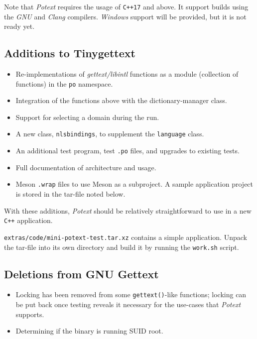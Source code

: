 \documentclass[
 11pt,
 twoside,
 a4paper,
 final                                 %
]{article}
\begin{document}
   Note that \textsl{Potext} requires the usage of \texttt{C++17}
   and above. It support builds using the \textsl{GNU} and \textsl{Clang}
   compilers.
   \textsl{Windows} support will be provided, but it is not ready yet.

\subsection{Additions to Tinygettext}
\label{subsec:introduction_additions}

   \begin{itemize}
      \item Re-implementations of \textsl{gettext/libintl}
         functions as a module
         (collection of functions) in the \texttt{po} namespace.
      \item Integration of the functions above with the
         dictionary-manager class.
      \item Support for selecting a domain during the run.
      \item A new class, \texttt{nlsbindings}, to supplement the
         \texttt{language} class.
      \item An additional test program, test \texttt{.po} files,
         and upgrades to existing tests.
      \item Full documentation of architecture and usage.
      \item Meson \texttt{.wrap} files to use Meson as a subproject.
         A sample application project is stored in the tar-file noted
         below.
   \end{itemize}

   With these additions, \textsl{Potext} should be relatively straightforward
   to use in a new \texttt{C++} application.

   \texttt{extras/code/mini-potext-test.tar.xz}
   contains a simple application.
   Unpack the tar-file into its own directory
   and build it by running the
   \texttt{work.sh} script.

\subsection{Deletions from GNU Gettext}
\label{subsec:introduction_deletions}

   \begin{itemize}
      \item Locking has been removed from some \texttt{gettext()}-like
         functions; locking can be put back once testing reveals
        it necessary for the use-cases that \textsl{Potext} supports.
      \item Determining if the binary is running SUID root.
   \end{itemize}
\end{document}
